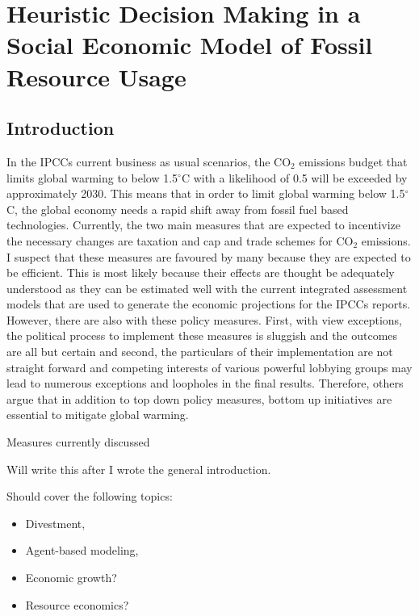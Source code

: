 \chapter{Heuristic Decision Making in a Social Economic Model of Fossil Resource Usage}
\label{chapter:heuristics}
\section{Introduction}

In the IPCCs current business as usual scenarios, the CO$_{2}$ emissions budget that limits global warming to below 1.5$^{\circ}$C with a likelihood of 0.5 will be exceeded by approximately 2030. This means that in order to limit global warming below 1.5$^{\circ}$C, the global economy needs a rapid shift away from fossil fuel based technologies. Currently, the two main measures that are expected to incentivize the necessary changes are taxation and cap and trade schemes for CO$_{2}$ emissions. I suspect that these measures are favoured by many because they are expected to be efficient. This is most likely because their effects are thought be adequately understood as they can be estimated well with the current integrated assessment models that are used to generate the economic projections for the IPCCs reports. However, there are also with these policy measures. First, with view exceptions, the political process to implement these measures is sluggish and the outcomes are all but certain and second, the particulars of their implementation are not straight forward and competing interests of various powerful lobbying groups may lead to numerous exceptions and loopholes in the final results.
Therefore, others argue that in addition to top down policy measures, bottom up initiatives are essential to mitigate global warming. 

Measures currently discussed 

Will write this after I wrote the general introduction.

Should cover the following topics:
\begin{itemize}
  \item Divestment,
  \item Agent-based modeling,
  \item Economic growth?
  \item Resource economics?
\end{itemize}

